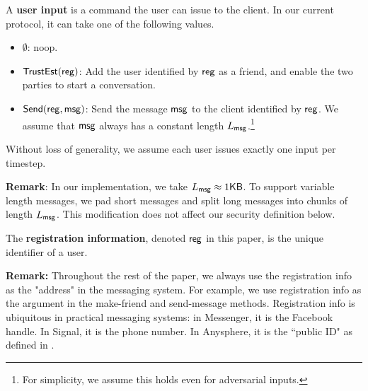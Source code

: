 \begin{definition}
\label{defn:messaging-user-input}
A \textbf{user input} is a command the user can issue to the client. In our current protocol, it can take one of the following values.
\begin{itemize}
    \item $\emptyset$: noop.
    \item $\mathsf{TrustEst}(\mathsf{reg})$: Add the user identified by $\mathsf{reg}$ as a friend, and enable the two parties to start a conversation.
    \item $\mathsf{Send}(\mathsf{reg}, \mathsf{msg})$: Send the message $\mathsf{msg}$ to the client identified by $\mathsf{reg}$. We assume that $\mathsf{msg}$ always has a constant length $L_{\mathsf{msg}}$.\footnote{For simplicity, we assume this holds even for adversarial inputs.}
\end{itemize}

Without loss of generality, we assume each user issues exactly one input per timestep.
\end{definition}
\textbf{Remark}:  In our implementation, we take $L_{\mathsf{msg}} \approx 1\mathsf{KB}$. To support variable length messages, we pad short messages and split long messages into chunks of length $L_{\mathsf{msg}}$. This modification does not affect our security definition below.
\begin{definition}
\label{defn:messaging-registration-info}
The \textbf{registration information}, denoted $\mathsf{reg}$ in this paper, is the unique identifier of a user.
\end{definition}
\textbf{Remark: }Throughout the rest of the paper, we  always use the registration info as the "address" in the messaging system. For example, we  use registration info as the argument in the make-friend and send-message methods. Registration info is ubiquitous in practical messaging systems: in Messenger, it is the Facebook handle. In Signal, it is the phone number. In Anysphere, it is the ``public ID" as defined in \cite[Figure 6]{whitepaper}.
